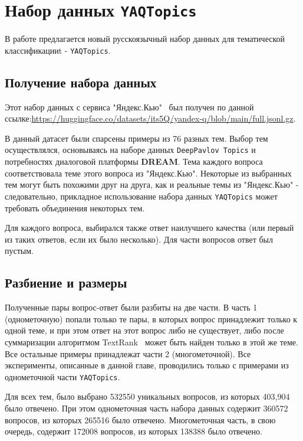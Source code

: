\section{Набор данных \texttt{YAQTopics}} 

В работе предлагается новый русскоязычный набор данных для тематической классификацииt - \texttt{YAQTopics}. 
\subsection{Получение набора данных}
Этот набор данных с сервиса "Яндекс.Кью"~\cite{yandex_q} был получен по данной ссылке:\url{https://huggingface.co/datasets/its5Q/yandex-q/blob/main/full.jsonl.gz}.

В данный датасет были спарсены примеры из 76 разных тем. Выбор тем осуществлялся, основываясь на наборе данных \texttt{DeepPavlov Topics} и потребностях диалоговой платформы \textbf{DREAM}. Тема каждого вопроса соответствовала теме этого вопроса из "Яндекс.Кью". Некоторые из выбранных тем могут быть похожими друг на друга, как и реальные темы из "Яндекс.Кью" - следовательно, прикладное использование набора данных \texttt{YAQTopics} может требовать объединения некоторых тем. 

 Для каждого вопроса, выбирался также ответ наилучшего качества (или первый из таких ответов, если их было несколько). Для части вопросов ответ был пустым. 
 


\subsection{Разбиение и размеры}
Полученные пары вопрос-ответ были разбиты на две части. В часть 1 (однометочную) попали только те пары, в которых вопрос принадлежит только к одной теме, и при этом ответ на этот вопрос либо не существует, либо после суммаризации алгоритмом TextRank~\cite{summarizer} может быть найден только в этой же теме. Все остальные примеры принадлежат части 2 (многометочной). Все эксперименты, описанные в данной главе, проводились только с примерами из однометочной части \texttt{YAQTopics}.

Для всех тем, было выбрано 532550 уникальных вопросов, из которых 403,904 было отвечено. При этом однометочная часть набора данных содержит 360572 вопросов, из которых 265516 было отвечено. Многометочная часть, в свою очередь, содержит 172008 вопросов, из которых 138388 было отвечено.

